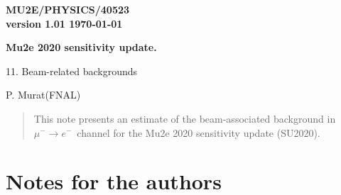 \documentclass[12pt]{article}
\newcommand {\MuToEm}     {\mbox{$\mu^- \ra e^-$}}
\newcommand {\ra}        {\rightarrow}
\begin{document}
\begin{titlepage}
  \begin{flushright}
    \bf {MU2E/PHYSICS/40523} \\
    version 1.01
    \today
 \end{flushright}

  \vspace{1cm}

  \begin{center}
    {\Large \bf Mu2e 2020 sensitivity update.

      \vspace{0.3in}

      11. Beam-related backgrounds
    }

    \vspace{1cm}

    P. Murat(FNAL)

    \vspace{0.3cm}

    \vspace{0.8cm}
  \end{center}

  \begin{abstract}
    This note presents an estimate of the beam-associated background in \MuToEm\ channel
    for the Mu2e 2020 sensitivity update (SU2020).
    \vspace{0.2in}
  \end{abstract}

\end{titlepage}
%
%
%
{\tableofcontents}

% 

\newpage
\section {Notes for the authors}
\end{document}
